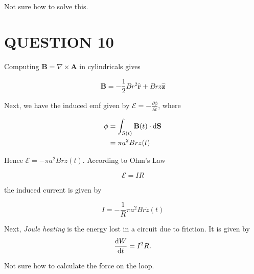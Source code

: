 \documentclass[a4paper]{article}
\begin{document}
Not sure how to solve this. 


\section{QUESTION 10}


Computing $ \mathbf{B} = \nabla  \times \mathbf{A} $ in cylindricals gives

\[ \mathbf{B} = - \frac{1}{2} B r^{2} \hat{\mathbf{r}} + B r z \hat{\mathbf{z}} \]

Next, we have the induced emf given by $ \mathcal{E}  = - \frac{\partial \phi }{\partial t} $, where

\begin{align*}
\phi & = \int_{S(t)} \mathbf{B}(t) \cdot \mathrm{d} \mathbf{S} \\
& = \pi a^{2} B r z(t) \\
\end{align*}

Hence $ \mathcal{E} = - \pi a^{2} B r \dot{z}(t) $. According to Ohm's Law

\[ \mathcal{E} = I R \]

the induced current is given by

\[ I = - \frac{1}{R} \pi a^{2} B r \dot{z}(t)  \]

Next, \emph{Joule heating} is the energy lost in a circuit due to friction. It is given by
\[
\frac{\mathrm{d} W}{\mathrm{d} t} = I^2 R.
\]

Not sure how to calculate the force on the loop. 
\end{document}
